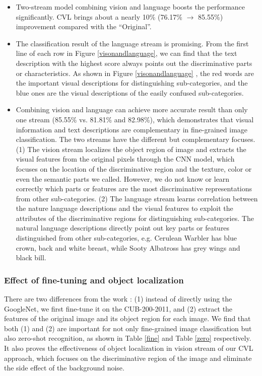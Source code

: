 \documentclass[10pt,twocolumn,letterpaper]{article}
\begin{document}
\begin{itemize}
\item
Two-stream model combining vision and language boosts the performance significantly. CVL brings about a nearly 10\% (76.17\% $\to$ 85.55\%) improvement compared with the ``Original''.
\item
The classification result of the language stream is promising. From the first line of each row in Figure \ref{visonandlanguage}, we can find that the text description with the highest score always points out the discriminative parts or characteristics. As shown in Figure \ref{visonandlanguage} , the red words are the important visual descriptions for distinguishing sub-categories, and the blue ones are the visual descriptions of the easily confused sub-categories.

\item
Combining vision and language can achieve more accurate result than only one stream (85.55\% vs. 81.81\% and 82.98\%), which demonstrates that visual information and text descriptions are complementary in fine-grained image classification. The two streams have the different but complementary focuses. (1) The vision stream localizes the object region of image and extracts the visual features from the original pixels through the CNN model, which focuses on the location of the discriminative region and the texture, color or even the semantic parts we called. However, we do not know or learn correctly which parts or features are the most discriminative representations from other sub-categories. (2) The language stream learns correlation between the nature language descriptions and the visual features to exploit the attributes of the discriminative regions for distinguishing sub-categories. The natural language descriptions directly point out key parts or features distinguished from other sub-categories, e.g. Cerulean Warbler has blue crown, back and white breast, while Sooty Albatross has grey wings and black bill.
\end{itemize}

\subsubsection{Effect of fine-tuning and object localization}
There are two differences from the work \cite{deeprepresentations}: (1) instead of directly using the GoogleNet, we first fine-tune it on the CUB-200-2011, and (2) extract the features of the original image and its object region for each image. We find that both (1) and (2) are important for not only fine-grained image classification but also zero-shot recognition, as shown in Table \ref{fine} and Table \ref{zero} respectively. It also proves the effectiveness of object localization in vision stream of our CVL approach, which focuses on the discriminative region of the image and eliminate the side effect of the background noise. 
\end{document}
